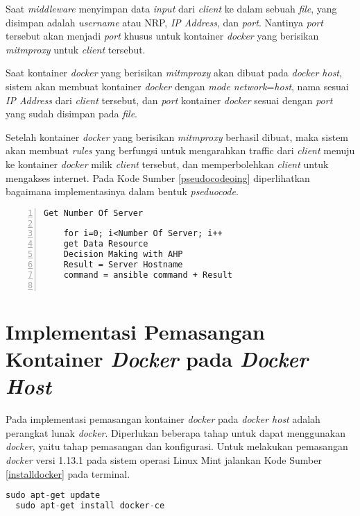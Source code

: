   Saat \textit{middleware} menyimpan data \textit{input} dari \textit{client} ke dalam sebuah \textit{file}, yang disimpan adalah \textit{username} atau NRP, \textit{IP Address}, dan \textit{port}. Nantinya \textit{port} tersebut akan menjadi \textit{port} khusus untuk kontainer \textit{docker} yang berisikan \textit{mitmproxy} untuk \textit{client} tersebut.
  
  Saat kontainer \textit{docker} yang berisikan \textit{mitmproxy} akan dibuat pada \textit{docker host}, sistem akan membuat kontainer \textit{docker} dengan \textit{mode network}=\textit{host}, nama sesuai \textit{IP Address} dari \textit{client} tersebut, dan \textit{port} kontainer \textit{docker} sesuai dengan \textit{port} yang sudah disimpan pada \textit{file}.
  
  Setelah kontainer \textit{docker} yang berisikan \textit{mitmproxy} berhasil dibuat, maka sistem akan membuat \textit{rules} yang berfungsi untuk mengarahkan traffic dari \textit{client} menuju ke kontainer \textit{docker} milik \textit{client} tersebut, dan memperbolehkan \textit{client} untuk mengakses internet. Pada Kode Sumber \ref{pseudocodeoing} diperlihatkan bagaimana implementasinya dalam bentuk \textit{pseduocode}.
  \newline
  \begin{minipage}{\linewidth}  
  	\begin{lstlisting}[numbers=left, frame=single,tabsize=2,breaklines,caption={Pseudocode Web Service},label=pseudocodeoing]
  	Get Number Of Server 
  	
  	for i=0; i<Number Of Server; i++
  	get Data Resource    
  	Decision Making with AHP
  	Result = Server Hostname
  	command = ansible command + Result
  	
  	\end{lstlisting}
  \end{minipage}
  
  \section{Implementasi Pemasangan Kontainer \textit{Docker} pada \textit{Docker Host}}
  Pada implementasi pemasangan kontainer \textit{docker} pada \textit{docker host} adalah perangkat lunak \textit{docker}. Diperlukan beberapa tahap untuk dapat menggunakan \textit{docker}, yaitu tahap pemasangan dan konfigurasi. Untuk melakukan pemasangan \textit{docker} versi 1.13.1 pada sistem operasi Linux Mint jalankan Kode Sumber \ref{installdocker} pada terminal.
  \newline
  \begin{minipage}{\linewidth}
  \begin{lstlisting}[caption=Perintah untuk installasi Docker,language=Python,label=installdocker]
  sudo apt-get update
  sudo apt-get install docker-ce
  \end{lstlisting}
  \end{minipage}
  
